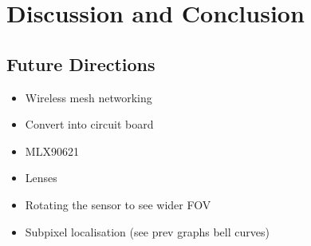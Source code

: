\documentclass[../thesis/thesis.tex]{subfiles}
\begin{document}
 \chapter{Discussion and Conclusion}
 
\section{Future Directions}
\begin{itemize}
 \item Wireless mesh networking
 \item Convert into circuit board
 \item MLX90621
 \item Lenses
 \item Rotating the sensor to see wider FOV
 \item Subpixel localisation (see prev graphs bell curves)
\end{itemize}

 
\end{document}
